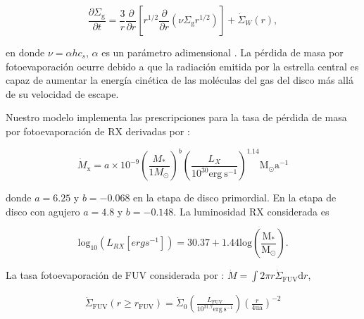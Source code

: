 \documentclass[baaa]{baaa}
\begin{document}
\begin{equation} 

  \frac{\partial \Sigma_{\text{g}}} {\partial t}= \frac{3}{r}\frac{\partial}{\partial r} \left[ r^{1/2} \frac{\partial}{\partial r} \left( \nu \Sigma_{\text{g}} r^{1/2}  \right) \right] + \dot{\Sigma}_W (r),

\label{eq:disk_evol}

\end{equation}



en donde $\nu = \alpha h c_{s} $, $\alpha$ es un par\'ametro adimensional \citep{shakura1973black}. La p\'erdida de masa por fotoevaporaci\'on ocurre debido a que la radiación emitida por la estrella central es capaz de aumentar la energía cinética de las moléculas del gas del disco más allá de su velocidad de escape.

 

Nuestro modelo implementa las prescripciones para la tasa de p\'erdida de masa por fotoevaporaci\'on de RX derivadas por \citet{owen2010implementationfoto}:


    \begin{equation}

        \dot{M}_{\mathrm{x}}= a\times 10 ^{-9}\left(\frac{M_{*}}{1M_{\odot}}\right)^{ b} 
     \left(\frac{L_X}{10^{30} \mathrm{erg}~\mathrm{s}^{-1}} \right)^{1.14}\mathrm{M}_{\odot}\mathrm{a}^{-1}

    \label{eq:Mpunto}

    \end{equation}


donde $a=6.25$ y $b=-0.068$ en la etapa de disco primordial. En la etapa de disco con agujero $a=4.8$ y $b=-0.148$. La luminosidad RX considerada es

\begin{equation}

    \mathrm{log}_{10}(L_{RX}[ergs^{-1}]) = 30.37 + 1.44\mathrm{log}\left( \frac{\mathrm{M}_{*}}{\mathrm{M}_{\odot}}\right).

    \label{ec:lum_RX}

\end{equation}

La tasa fotoevaporaci\'on de FUV considerada por \citet{kunitoma2021tasas}: $\dot{M} = \int 2 \pi r \dot{\Sigma}_{\mathrm{FUV}}\mathrm{d}r$,

\begin{align}

    \dot{\Sigma}_{\mathrm{FUV}}(r\geq r _{\mathrm{FUV}}) = \dot{\Sigma}_{0} \left( \frac{L _{\mathrm{FUV}}}{10^{31.7}\mathrm{erg}~\mathrm{s}^{-1}} \right) \left( \frac{r}{4\text{ua}} \right)^{-2}

\end{align}
\end{document}
